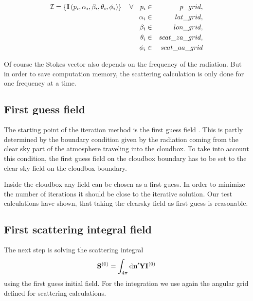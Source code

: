 \begin{itemize}
\begin{eqnarray}
{\mathcal I} = \left\{ {\bf I} \left( p_i, \alpha_i, \beta_i, \theta_i, \phi_i\right)\right\}   \quad
\forall \quad p_i &\in& p\_grid,\\
 \alpha_i &\in& lat\_grid, \\
 \beta_i &\in& lon\_grid, \\
 \theta_i &\in& scat\_za\_grid, \\
 \phi_i &\in& scat\_aa\_grid 
\end{eqnarray}

Of course the Stokes vector also depends on the frequency of the
radiation. But in order to save computation memory, the scattering
calculation is only done for one frequency at a time.

\end{itemize}


\subsection{First guess field}

The starting point of the iteration method is the first guess field
. This is partly determined by the boundary condition given
by the radiation coming from the clear sky part of the atmosphere
traveling into the cloudbox. To take into account this condition, the
first guess field on the cloudbox boundary has to be set to the clear
sky field on the cloudbox boundary.

Inside the cloudbox any field can be chosen as a first guess. In order
to minimize the number of iterations it should be close to the
iterative solution. Our test calculations have shown, that taking the
clearsky field as first guess is reasonable.


\subsection{First scattering integral field}

The next step is solving the scattering integral
\begin{eqnarray}
  {\bf S}^{(0)} = \int_{4\pi} \mathrm{d} {\bf n}^\prime
  {\bf Y} {\bf I}^{(0)}
\label{eq:scat_int}
\end{eqnarray}
using the first guess initial field. For the integration we use again
the angular grid defined for scattering calculations.

